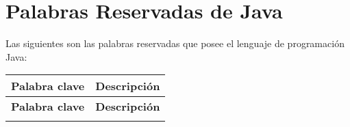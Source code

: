 \documentclass[12pt]{article}
\theoremstyle{largebreak}
\begin{document}
    \newpage

    \section*{Palabras Reservadas de Java}

    Las siguientes son las palabras reservadas que posee el lenguaje de programación Java:

    \begin{longtable}{l p{}}
    \toprule
    \textbf{Palabra clave} & \textbf{Descripción} \\
    \midrule
    \endfirsthead

    \midrule
    \textbf{Palabra clave} & \textbf{Descripción} \\
    \midrule
    \endhead

    \bottomrule
    \endfoot


\end{longtable}
\end{document}
